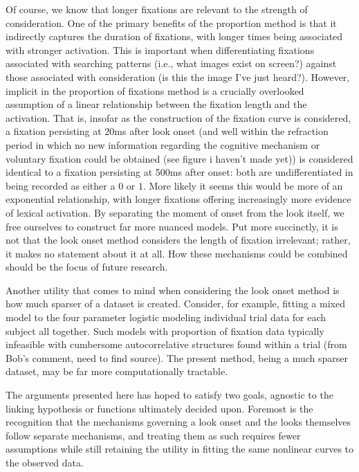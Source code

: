 Of course, we know that longer fixations are relevant to the strength of consideration. One of the primary benefits of the proportion method is that it indirectly captures the duration of fixations, with longer times being associated with stronger activation. This is important when differentiating fixations associated with searching patterns (i.e., what images exist on screen?) against those associated with consideration (is this the image I've just heard?). However, implicit in the proportion of fixations method is a crucially overlooked assumption of a linear relationship between the fixation length and the activation. That is, insofar as the construction of the fixation curve is considered, a fixation persisting at 20ms after look onset (and well within the refraction period in which no new information regarding the cognitive mechanism or voluntary fixation could be obtained (see figure i haven't made yet)) is considered identical to a fixation persisting at 500ms after onset: both are undifferentiated in being recorded as either a $0$ or $1$. More likely it seems this would be more of an exponential relationship, with longer fixations offering increasingly more evidence of lexical activation. By separating the moment of onset from the look itself, we free ourselves to construct far more nuanced models. Put more succinctly, it is not that the look onset method considers the length of fixation irrelevant; rather, it makes no statement about it at all. How these mechanisms could be combined should be the focus of future research.

Another utility that comes to mind when considering the look onset method is how much sparser of a dataset is created. Consider, for example, fitting a mixed model to the four parameter logistic modeling individual trial data for each subject all together. Such models with proportion of fixation data typically infeasible with cumbersome autocorrelative structures found within a trial (from Bob's comment, need to find source). The present method, being a much sparser dataset, may be far more computationally tractable. 


The arguments presented here has hoped to satisfy two goals, agnostic to the linking hypothesis or functions ultimately decided upon. Foremost is the recognition that the mechanisms governing a look onset and the looks themselves follow separate mechanisms, and treating them as such requires fewer assumptions while still retaining the utility in fitting the same nonlinear curves to the observed data.

